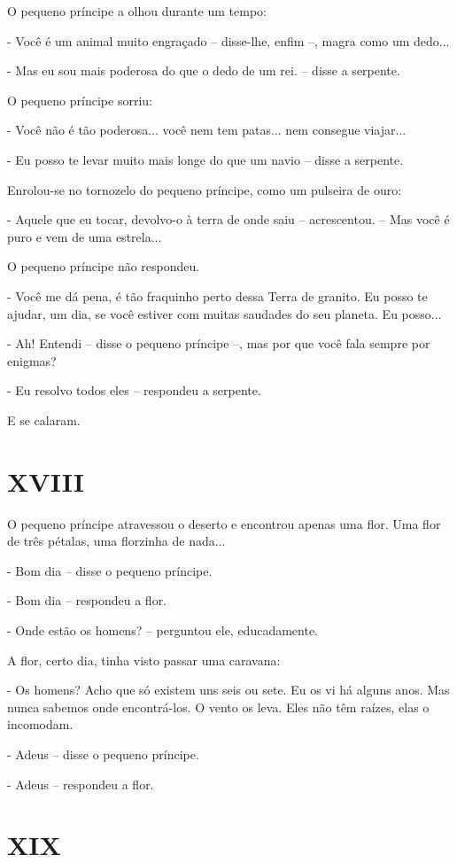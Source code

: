 O pequeno príncipe a olhou durante um tempo:

- Você é um animal muito engraçado -- disse-lhe, enfim --, magra como um
dedo...

- Mas eu sou mais poderosa do que o dedo de um rei. -- disse a serpente.

O pequeno príncipe sorriu:

- Você não é tão poderosa... você nem tem patas... nem consegue
viajar...

- Eu posso te levar muito mais longe do que um navio -- disse a
serpente.

Enrolou-se no tornozelo do pequeno príncipe, como um pulseira de ouro:

- Aquele que eu tocar, devolvo-o à terra de onde saiu -- acrescentou. --
Mas você é puro e vem de uma estrela...

O pequeno príncipe não respondeu.

- Você me dá pena, é tão fraquinho perto dessa Terra de granito. Eu
posso te ajudar, um dia, se você estiver com muitas saudades do seu
planeta. Eu posso...

- Ah! Entendi -- disse o pequeno príncipe --, mas por que você fala
sempre por enigmas?

- Eu resolvo todos eles -- respondeu a serpente.

E se calaram.

\chapter{XVIII}

O pequeno príncipe atravessou o deserto e encontrou apenas uma flor. Uma
flor de três pétalas, uma florzinha de nada...

- Bom dia -- disse o pequeno príncipe.

- Bom dia -- respondeu a flor.

- Onde estão os homens? -- perguntou ele, educadamente.

A flor, certo dia, tinha visto passar uma caravana:

- Os homens? Acho que só existem uns seis ou sete. Eu os vi há alguns
anos. Mas nunca sabemos onde encontrá-los. O vento os leva. Eles não têm
raízes, elas o incomodam.

- Adeus -- disse o pequeno príncipe.

- Adeus -- respondeu a flor.

\chapter{XIX}

